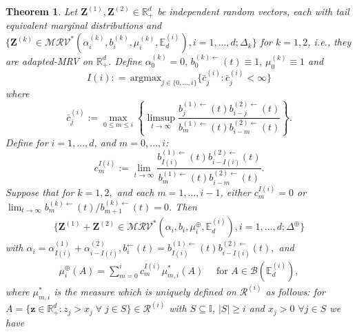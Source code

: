 \documentclass[aos]{imsart}
\numberwithin{equation}{section}
\theoremstyle{plain} %
\newtheorem{theorem}{Theorem}[section]
\theoremstyle{remark}
\newcommand{\beao}{\begin{eqnarray*}}
\newcommand{\eeao}{\end{eqnarray*}\noindent}
\newcommand{\E}{\mathbb{E}}
\newcommand{\R}{\mathbb{R}}
\newcommand{\VF}[1]{{\color{blue} #1}}
\def\MRV{\mathcal{MRV}}
\def\cR{\mathcal{R}}
\def\bZ{\boldsymbol Z}
\def\bz{\boldsymbol z}
\newcommand{\DAS}[1]{{\color{red} #1}}
\begin{document}
\begin{theorem} \label{mainTheorem}
Let $\bZ^{(1)}, \bZ^{(2)} \in \R_+^d$ be independent random vectors, each with tail equivalent marginal distributions and $\{\bZ^{(k)}\in \MRV^*(\alpha_i^{(k)},b_i^{(k)},\mu_i^{(k)},\E_d^{(i)}), i=1,\ldots,d; \Delta_k\}$ for $k=1,2$, i.e., they are adapted-MRV on $\R^d_{+}$. Define $\alpha_0^{(k)}=0, \, b_0^{(k)\leftarrow}(t)\equiv 1,\, \mu_0^{(k)}\equiv 1$ and
\[ I(i): =   \,\mathrm{argmax}_{j \in \{0,\ldots,i\}}  \{\bar{c}_j^{(i)}: \bar{c}_j^{(i)}<\infty\}\]
where
\[ \bar{c}_j^{(i)}:= \max_{0\le m\le i}\left\{\limsup_{t\to\infty} \frac{b_{j}^{(1)\leftarrow}(t)b_{i-j}^{(2)\leftarrow}(t)}{b_{m}^{(1)\leftarrow}(t)b_{i-m}^{(2)\leftarrow}(t)} \right\}.\]
Define for $i=1,\ldots, d$, and $m=0,\ldots, i$:
$$c_m^{I(i)}:=\lim_{t\to\infty}\frac{b_{I(i)}^{(1)\leftarrow}(t)b_{i-I(i)}^{(2)\leftarrow}(t)}{b_{m}^{(1)\leftarrow}(t)b_{i-m}^{(2)\leftarrow}(t)}.$$
%
Suppose that for  $k=1,2, $ and each $m=1,\ldots,i-1$, either
$c_m^{I(i)}=0$ or  $\lim_{t\to\infty}b_m^{(k)\leftarrow}(t)/b_{m+1}^{(k)\leftarrow}(t)=0$.
 Then
 \beao
    \{\bZ^{(1)}+\bZ^{(2)}\in\MRV^*(\alpha_{i},b_{i},\mu_{i}^{\oplus},\E_d^{(i)}), i=1,\ldots,d;\Delta^{\oplus}\}
 \eeao
 with $\alpha_i=  \alpha_{I(i)}^{(1)} +\alpha_{i-I(i)}^{(2)}, b_{i}^{\leftarrow}(t)=b_{I(i)}^{(1)\leftarrow}(t)b_{i-{I(i)}}^{(2)\leftarrow}(t), $ and
 \beao
    \mu_i^{\oplus}(A)=\sum_{m=0}^i c_m^{I(i)}\mu_{m,i}^*(A) \quad \text{ for }A\in\mathcal{B}(\E_d^{(i)}),
 \eeao
 where $\mu_{m,i}^*$ is the measure which is uniquely defined on $\cR^{(i)}$ as follows: for \linebreak $A=\{\bz \in \R_+^d: z_j>x_j \;\forall\; j\in S\}\in \cR^{(i)}$ with $S\subseteq \mathbb{I}$, $|S|\ge i$ and $x_j>0$   $\forall j\in S$ we have %

\end{theorem}
\end{document}
